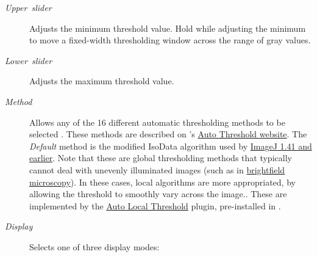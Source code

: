 \begin{description}
\item [{\emph{Upper\ slider}}] Adjusts the minimum threshold value. Hold
 while adjusting the minimum to move a fixed-width
thresholding window across the range of gray values.
\item [{\emph{Lower\ slider}}] Adjusts the maximum threshold value. 
\item [{\emph{Method}}] Allows any of the 16 different automatic thresholding
methods to be selected \cite{C-ThresMeth}. These methods are described
on 's \href{http://fiji.sc/wiki/index.php/Auto_Threshold}{Auto Threshold website}.
The \emph{Default} method is the modified IsoData algorithm used by
\href{http://imagej.nih.gov/ij/docs/faqs.html\#auto}{ImageJ 1.41 and earlier}.
Note that these are global thresholding methods that typically cannot
deal with unevenly illuminated images (such as in \href{http://imagejdocu.tudor.lu/doku.php?id=howto:working:how_to_correct_background_illumination_in_brightfield_microscopy}{brightfield microscopy}).
In these cases, local algorithms are more appropriated, by allowing
the threshold to smoothly vary across the image.. These are implemented
by the \href{http://fiji.sc/wiki/index.php/Auto_Local_Threshold}{Auto Local Threshold}
plugin, pre-installed in .
\item [{\emph{Display}}] Selects one of three display modes:


\end{description}

